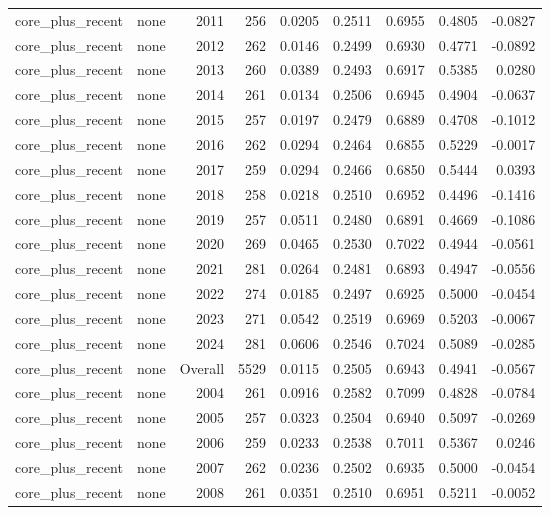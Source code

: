 \begin{table}[t]
\begin{tabular}{@{} l l r r r r r r r @{} }
      core\_plus\_recent & none & 2011 & 256 & 0.0205 & 0.2511 & 0.6955 & 0.4805 & -0.0827 \\
      core\_plus\_recent & none & 2012 & 262 & 0.0146 & 0.2499 & 0.6930 & 0.4771 & -0.0892 \\
      core\_plus\_recent & none & 2013 & 260 & 0.0389 & 0.2493 & 0.6917 & 0.5385 & 0.0280 \\
      core\_plus\_recent & none & 2014 & 261 & 0.0134 & 0.2506 & 0.6945 & 0.4904 & -0.0637 \\
      core\_plus\_recent & none & 2015 & 257 & 0.0197 & 0.2479 & 0.6889 & 0.4708 & -0.1012 \\
      core\_plus\_recent & none & 2016 & 262 & 0.0294 & 0.2464 & 0.6855 & 0.5229 & -0.0017 \\
      core\_plus\_recent & none & 2017 & 259 & 0.0294 & 0.2466 & 0.6850 & 0.5444 & 0.0393 \\
      core\_plus\_recent & none & 2018 & 258 & 0.0218 & 0.2510 & 0.6952 & 0.4496 & -0.1416 \\
      core\_plus\_recent & none & 2019 & 257 & 0.0511 & 0.2480 & 0.6891 & 0.4669 & -0.1086 \\
      core\_plus\_recent & none & 2020 & 269 & 0.0465 & 0.2530 & 0.7022 & 0.4944 & -0.0561 \\
      core\_plus\_recent & none & 2021 & 281 & 0.0264 & 0.2481 & 0.6893 & 0.4947 & -0.0556 \\
      core\_plus\_recent & none & 2022 & 274 & 0.0185 & 0.2497 & 0.6925 & 0.5000 & -0.0454 \\
      core\_plus\_recent & none & 2023 & 271 & 0.0542 & 0.2519 & 0.6969 & 0.5203 & -0.0067 \\
      core\_plus\_recent & none & 2024 & 281 & 0.0606 & 0.2546 & 0.7024 & 0.5089 & -0.0285 \\
      core\_plus\_recent & none & Overall & 5529 & 0.0115 & 0.2505 & 0.6943 & 0.4941 & -0.0567 \\
      core\_plus\_recent & none & 2004 & 261 & 0.0916 & 0.2582 & 0.7099 & 0.4828 & -0.0784 \\
      core\_plus\_recent & none & 2005 & 257 & 0.0323 & 0.2504 & 0.6940 & 0.5097 & -0.0269 \\
      core\_plus\_recent & none & 2006 & 259 & 0.0233 & 0.2538 & 0.7011 & 0.5367 & 0.0246 \\
      core\_plus\_recent & none & 2007 & 262 & 0.0236 & 0.2502 & 0.6935 & 0.5000 & -0.0454 \\
      core\_plus\_recent & none & 2008 & 261 & 0.0351 & 0.2510 & 0.6951 & 0.5211 & -0.0052 \\

\end{tabular}
\end{table}
